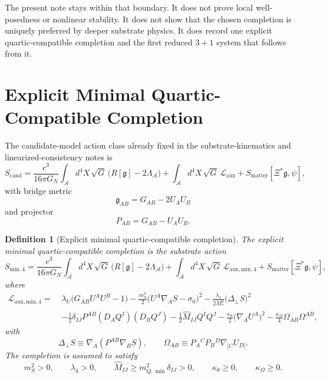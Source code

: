 \documentclass[11pt]{article}
\newcommand{\Sub}{\mathcal{A}}
\newcommand{\BridgeMetric}{\mathfrak{g}}
\newtheorem{definition}{Definition}
\begin{document}
The present note stays within that boundary. It does not prove local well-posedness or nonlinear stability. It does not show that the chosen completion is uniquely preferred by deeper substrate physics. It does record one explicit quartic-compatible completion and the first reduced \(3+1\) system that follows from it.

\section{Explicit Minimal Quartic-Compatible Completion}

The candidate-model action class already fixed in the substrate-kinematics and linearized-consistency notes is
\begin{equation}
S_{\mathrm{cand}}
=
\frac{c^3}{16\pi G_N}
\int_{\Sub} d^4X\,\sqrt{G}\,\bigl(R[\BridgeMetric]-2\Lambda_{\Sub}\bigr)
+ \int_{\Sub} d^4X\,\sqrt{G}\,\mathcal L_{\mathrm{aux}}
+ S_{\mathrm{matter}}[\Xi^*\BridgeMetric,\psi],
\label{eq:Scand}
\end{equation}
with bridge metric
\begin{equation}
\BridgeMetric_{AB}=G_{AB}-2U_AU_B
\label{eq:bridge}
\end{equation}
and projector
\begin{equation}
P_{AB}=G_{AB}-U_AU_B.
\label{eq:projector}
\end{equation}

\begin{definition}[Explicit minimal quartic-compatible completion]
The \emph{explicit minimal quartic-compatible completion} is the substrate action
\begin{equation}
S_{\mathrm{min},4}
=
\frac{c^3}{16\pi G_N}
\int_{\Sub} d^4X\,\sqrt{G}\,\bigl(R[\BridgeMetric]-2\Lambda_{\Sub}\bigr)
+ \int_{\Sub} d^4X\,\sqrt{G}\,\mathcal L_{\mathrm{aux,min},4}
+ S_{\mathrm{matter}}[\Xi^*\BridgeMetric,\psi],
\label{eq:Smin4}
\end{equation}
where
\begin{align}
\mathcal L_{\mathrm{aux,min},4}
=\;&
\lambda_U\bigl(G_{AB}U^AU^B-1\bigr)
-\frac{m_S^2}{2}\bigl(U^A\nabla_A S-\sigma_0\bigr)^2
-\frac{\lambda_4}{2M_*^2}\bigl(\Delta_\perp S\bigr)^2
\nonumber\\
&-\frac{1}{2}\delta_{IJ}P^{AB}(D_AQ^I)(D_BQ^J)
-\frac{1}{2}\widehat M_{IJ}Q^IQ^J
-\frac{\kappa_\theta}{2}\bigl(\nabla_AU^A\bigr)^2
-\frac{\kappa_\Omega}{4}\Omega_{AB}\Omega^{AB},
\label{eq:Lauxmin4}
\end{align}
with
\begin{equation}
\Delta_\perp S\equiv \nabla_A\!\left(P^{AB}\nabla_B S\right),
\qquad
\Omega_{AB}\equiv P_A{}^CP_B{}^D\nabla_{[C}U_{D]}.
\label{eq:quarticdefs}
\end{equation}
The completion is assumed to satisfy
\begin{equation}
m_S^2>0,
\qquad
\lambda_4>0,
\qquad
\widehat M_{IJ}\ge m_{Q,\min}^2\delta_{IJ}>0,
\qquad
\kappa_\theta\ge 0,
\qquad
\kappa_\Omega\ge 0.
\label{eq:positivity}
\end{equation}
\end{definition}
\end{document}
